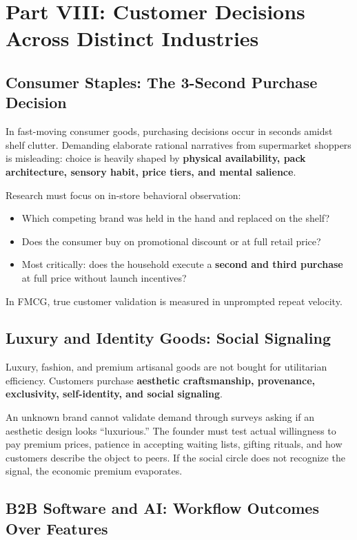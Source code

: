 \section{Part VIII: Customer Decisions Across Distinct Industries}

\subsection{Consumer Staples: The 3-Second Purchase Decision}

In fast-moving consumer goods, purchasing decisions occur in seconds amidst shelf clutter. Demanding elaborate rational narratives from supermarket shoppers is misleading: choice is heavily shaped by \textbf{physical availability, pack architecture, sensory habit, price tiers, and mental salience}.

Research must focus on in-store behavioral observation:
\begin{itemize}[leftmargin=1.2em,itemsep=0.2ex]
  \item Which competing brand was held in the hand and replaced on the shelf?
  \item Does the consumer buy on promotional discount or at full retail price?
  \item Most critically: does the household execute a \textbf{second and third purchase} at full price without launch incentives?
\end{itemize}
In FMCG, true customer validation is measured in unprompted repeat velocity.

\subsection{Luxury and Identity Goods: Social Signaling}

Luxury, fashion, and premium artisanal goods are not bought for utilitarian efficiency. Customers purchase \textbf{aesthetic craftsmanship, provenance, exclusivity, self-identity, and social signaling}.

An unknown brand cannot validate demand through surveys asking if an aesthetic design looks ``luxurious.'' The founder must test actual willingness to pay premium prices, patience in accepting waiting lists, gifting rituals, and how customers describe the object to peers. If the social circle does not recognize the signal, the economic premium evaporates.

\subsection{B2B Software and AI: Workflow Outcomes Over Features}

